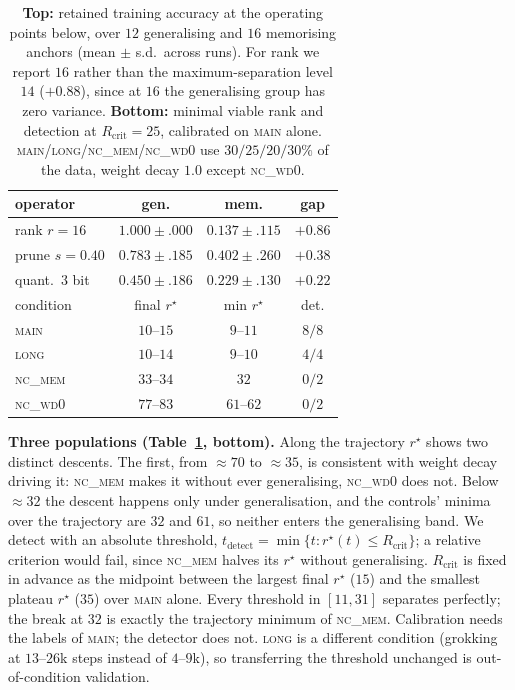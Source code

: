 \documentclass{article}
\begin{document}
\begin{table}[h]
	\caption{\textbf{Top:} retained training accuracy at the operating points below,
		over $12$ generalising and $16$ memorising anchors (mean $\pm$ s.d.\ across runs). For rank we report $16$ rather than the maximum-separation level $14$
		($+0.88$), since at $16$ the generalising group has zero variance.
		\textbf{Bottom:} minimal viable rank and detection at $R_{\text{crit}}{=}25$, calibrated
		on \textsc{main} alone. \textsc{main}/\textsc{long}/\textsc{nc\_mem}/\textsc{nc\_wd0} use $30/25/20/30\%$ of the data, weight decay $1.0$ except \textsc{nc\_wd0}.}
	\label{tab:main}
	\vskip 0.00in
	\begin{center}
		\begin{small}
			\setlength{\tabcolsep}{4.5pt}
			\begin{tabular}{lccc}
				\toprule
				operator & gen. & mem. & gap \\
				\midrule
				rank $r{=}16$    & $\mathbf{1.000 \pm .000}$ & $0.137 \pm .115$ & $\mathbf{+0.86}$ \\
				prune $s{=}0.40$ & $0.783 \pm .185$ & $0.402 \pm .260$ & $+0.38$ \\
				quant.\ $3$ bit  & $0.450 \pm .186$ & $0.229 \pm .130$ & $+0.22$ \\
				\midrule
				condition & final $r^\star$ & min $r^\star$ & det. \\
				\midrule
				\textsc{main}    & $10$--$15$ & $9$--$11$  & $8/8$ \\
				\textsc{long}    & $10$--$14$ & $9$--$10$  & $4/4$ \\
				\textsc{nc\_mem} & $33$--$34$ & $32$       & $0/2$ \\
				\textsc{nc\_wd0} & $77$--$83$ & $61$--$62$ & $0/2$ \\
				\bottomrule
			\end{tabular}
		\end{small}
	\end{center}
	\vskip -0.30in
\end{table}


\textbf{Three populations (Table~\ref{tab:main}, bottom).} Along the trajectory $r^\star$ shows two distinct descents. The first, from
${\approx}70$ to ${\approx}35$, is consistent with weight decay driving it:
\textsc{nc\_mem} makes it without ever generalising, \textsc{nc\_wd0} does not. Below
${\approx}32$ the descent happens only under generalisation, and the controls' minima
over the trajectory are $32$ and $61$, so neither enters the generalising
band.
We detect with an absolute threshold, $t_{\text{detect}} = \min\{t : r^\star(t) \leq
R_{\text{crit}}\}$; a relative criterion would fail, since \textsc{nc\_mem} halves its
$r^\star$ without generalising. $R_{\text{crit}}$ is fixed in advance as the midpoint
between the largest final $r^\star$ ($15$) and the smallest plateau $r^\star$ ($35$)
over \textsc{main} alone. Every threshold in
$[11,31]$ separates perfectly; the break at $32$ is exactly the trajectory minimum of
\textsc{nc\_mem}. Calibration needs the labels of \textsc{main}; the detector does not.
\textsc{long} is a different condition (grokking at $13$--$26$k steps instead of
$4$--$9$k), so transferring the threshold unchanged is out-of-condition validation.
\end{document}
